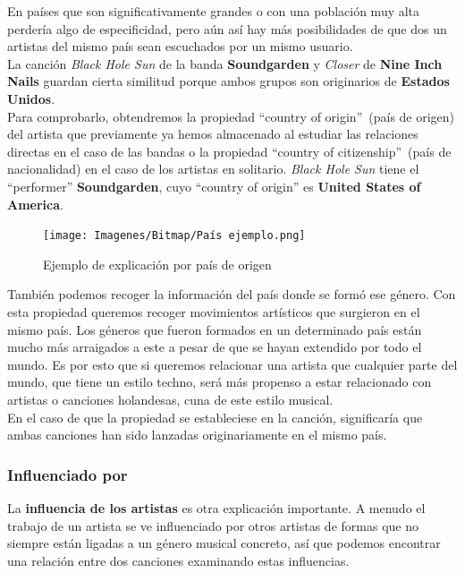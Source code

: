 En países que son significativamente grandes o con una población muy alta perdería algo de especificidad, pero aún así hay más posibilidades de que dos un artistas del mismo país sean escuchados por un mismo usuario.\\

La canción \textit{Black Hole Sun} de la banda \textbf{Soundgarden} y \textit{Closer} de \textbf{Nine Inch Nails} guardan cierta similitud porque ambos grupos son originarios de \textbf{Estados Unidos}.\\

Para comprobarlo, obtendremos la propiedad ``country of origin''~(país de origen) del artista que previamente ya hemos almacenado al estudiar las relaciones directas en el caso de las bandas o la propiedad ``country of citizenship''~(país de nacionalidad) en el caso de los artistas en solitario. \textit{Black Hole Sun} tiene el ``performer'' \textbf{Soundgarden}, cuyo ``country of origin'' es \textbf{United States of America}.\\

\begin{figure}[h!]
	\centering
	\texttt{[image: Imagenes/Bitmap/País ejemplo.png]}
	\caption{Ejemplo de explicación por país de origen}
	\label{fig:sampleImage}
\end{figure}

También podemos recoger la información del país donde se formó ese género. Con esta propiedad queremos recoger movimientos artísticos que surgieron en el mismo país. Los géneros que fueron formados en un determinado país están mucho más arraigados a este a pesar de que se hayan extendido por todo el mundo. Es por esto que si queremos relacionar una artista que cualquier parte del mundo, que tiene un estilo techno, será más propenso a estar relacionado con artistas o canciones holandesas, cuna de este estilo musical.\\

En el caso de que la propiedad se estableciese en la canción, significaría que ambas canciones han sido lanzadas originariamente en el mismo país.\\

\subsubsection*{Influenciado por}
\label{subsubsec:influenced}

La \textbf{influencia de los artistas} es otra explicación importante. A menudo el trabajo de un artista se ve influenciado por otros artistas de formas que no siempre están ligadas a un género musical concreto, así que podemos encontrar una relación entre dos canciones examinando estas influencias.\\

